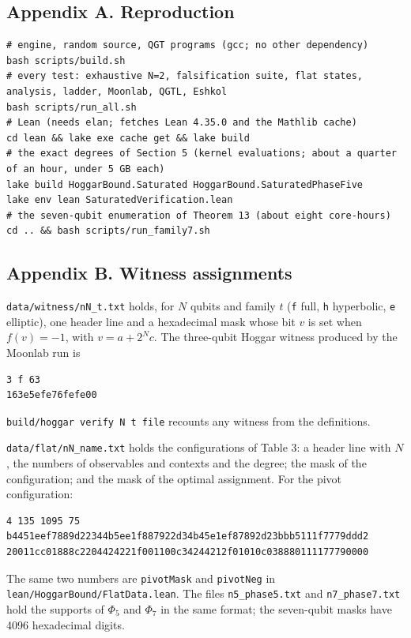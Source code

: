 \documentclass[11pt,a4paper]{article}
\begin{document}
\subsection{Appendix A. Reproduction}\label{appendix-a-reproduction}

\begin{verbatim}
# engine, random source, QGT programs (gcc; no other dependency)
bash scripts/build.sh
# every test: exhaustive N=2, falsification suite, flat states, analysis, ladder, Moonlab, QGTL, Eshkol
bash scripts/run_all.sh
# Lean (needs elan; fetches Lean 4.35.0 and the Mathlib cache)
cd lean && lake exe cache get && lake build
# the exact degrees of Section 5 (kernel evaluations; about a quarter of an hour, under 5 GB each)
lake build HoggarBound.Saturated HoggarBound.SaturatedPhaseFive
lake env lean SaturatedVerification.lean
# the seven-qubit enumeration of Theorem 13 (about eight core-hours)
cd .. && bash scripts/run_family7.sh
\end{verbatim}

\subsection{Appendix B. Witness assignments}\label{appendix-b-witness-assignments}

\texttt{data/witness/nN\_t.txt} holds, for \(N\) qubits and family \(t\) (\texttt{f} full, \texttt{h} hyperbolic, \texttt{e} elliptic), one
header line and a hexadecimal mask whose bit \(v\) is set when \(f(v) = -1\), with \(v = a + 2^N c\). The
three-qubit Hoggar witness produced by the Moonlab run is

\begin{verbatim}
3 f 63
163e5efe76fefe00
\end{verbatim}

\texttt{build/hoggar\ verify\ N\ t\ file} recounts any witness from the definitions.

\texttt{data/flat/nN\_name.txt} holds the configurations of Table 3: a header line with \(N\), the numbers of
observables and contexts and the degree; the mask of the configuration; and the mask of the optimal
assignment. For the pivot configuration:

\begin{verbatim}
4 135 1095 75
b4451eef7889d22344b5ee1f887922d34b45e1ef87892d23bbb5111f7779ddd2
20011cc01888c2204424221f001100c34244212f01010c038880111177790000
\end{verbatim}

The same two numbers are \texttt{pivotMask} and \texttt{pivotNeg} in \texttt{lean/HoggarBound/FlatData.lean}. The files
\texttt{n5\_phase5.txt} and \texttt{n7\_phase7.txt} hold the supports of \(\Phi_5\) and \(\Phi_7\) in the same format; the
seven-qubit masks have 4096 hexadecimal digits.
\end{document}
